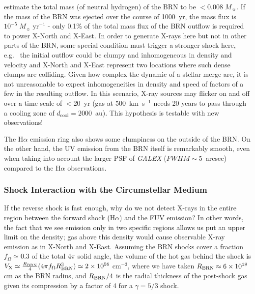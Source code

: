 \documentclass[linenumbers]{aastex631}
\begin{document}
\citet{2020Natur.587..387H} estimate the total mass (of neutral hydrogen) of the BRN to be $<0.008\;M_\sun{}$. If the mass of the BRN was ejected over the course of 1000~yr, the mass flux is $10^{-5}\;M_\sun\;\mathrm{yr}^{-1}$ - only 0.1\% of the total mass flux of the BRN outflow is required to power X-North and X-East. In order to generate X-rays here but not in other parts of the BRN, some special condition must trigger a stronger shock here, e.g.\
the initial outflow could be clumpy and inhomogeneous in density and velocity and X-North and X-East represent two locations where such dense clumps are colliding. Given how complex the dynamic of a stellar merge are, it is not unreasonable to expect inhomogeneities in density and speed of factors of a few in the resulting outflow. In this scenario, X-ray sources may flicker on and off over a time scale of $<20$~yr (gas at 500~km~s$^{-1}$ needs 20 years to pass through a cooling zone of $d_{\mathrm{cool}}=2000$~au). This hypothesis is testable with new observations!

The H$\alpha$ emission ring also shows some clumpiness on the outside of the BRN. On the other hand, the UV emission from the BRN itself is remarkably smooth, even when taking into account the larger PSF of \emph{GALEX} ($FWHM \sim 5$~arcsec) compared to the H$\alpha$ observations.


\subsubsection{Shock Interaction with the Circumstellar Medium}
\label{sec:ISM}
If the reverse shock is fast enough, why do we not detect X-rays in the entire region between the forward shock (H$\alpha$) and the FUV emission? In other words, the fact that we see emission only in two specific regions allows us put an upper limit on the density; gas above this density would cause observable X-ray emission as in X-North and X-East.
Assuming the BRN shocks cover a fraction $f_{\Omega} \simeq 0.3$ of the total 4$\pi$ solid angle,  the volume of the hot gas behind the shock is $V_{\rm X} \simeq \frac{R_{\rm BRN}}{4}(4\pi f_{\Omega} R_{\rm BRN}^{3}) \simeq 2\times 10^{56}$ cm$^{-3}$, where we have taken $R_{\rm BRN} \approx 6\times 10^{18}$ cm as the BRN radius, and $R_{\rm BRN}/4$ is the radial thickness of the post-shock gas given its compression by a factor of 4 for a $\gamma = 5/3$ shock.
\end{document}
